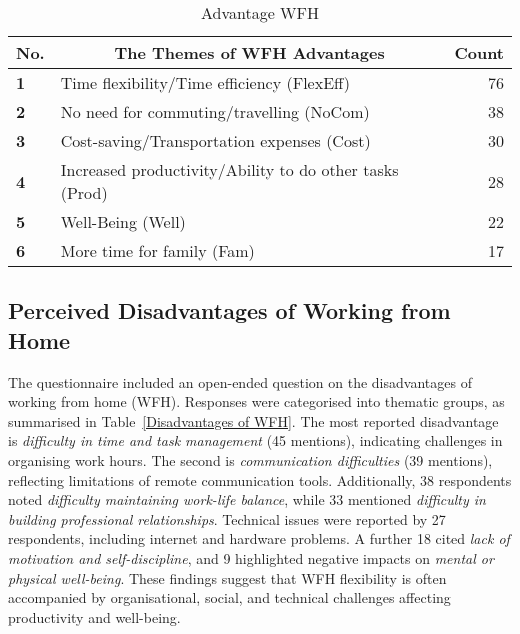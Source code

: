 \documentclass[a4paper, conference]{IEEEtran}
\begin{document}
\begin{table}[ht]
	\caption{Advantage WFH}
	\label{Advantage of WFH}
	\begin{tabular}{|p{}|p{}|r|}
		\hline
		\multicolumn{1}{|c|}{\textbf{No.}} & \multicolumn{1}{c|}{\textbf{The Themes of WFH Advantages}} & \textbf{Count} \\ \hline
		\textbf{1}                 & Time flexibility/Time efficiency (FlexEff)         &76 %
		\\ \hline
		\textbf{2}                 & No need for commuting/travelling (NoCom)        & 38 %
		\\ \hline
		\textbf{3}                 & Cost-saving/Transportation expenses (Cost)        & 30 %
		\\ \hline
		\textbf{4}                 & Increased productivity/Ability to do other tasks (Prod)& 28 %
		\\ \hline
		\textbf{5}                 & Well-Being (Well)        & 22     
		\\ \hline
		\textbf{6}                 & More time for family (Fam)              & 17 %
		\\ \hline
	\end{tabular}
\end{table}

\subsection{Perceived Disadvantages of Working from Home}
\label{sec:disadvantage-wfh}

The questionnaire included an open-ended question on the disadvantages of working from home (WFH). Responses were categorised into thematic groups, as summarised in Table~\ref{Disadvantages of WFH}. The most reported disadvantage is \textit{difficulty in time and task management} (45 mentions), indicating challenges in organising work hours. The second is \textit{communication difficulties} (39 mentions), reflecting limitations of remote communication tools. Additionally, 38 respondents noted \textit{difficulty maintaining work-life balance}, while 33 mentioned \textit{difficulty in building professional relationships}. Technical issues were reported by 27 respondents, including internet and hardware problems. A further 18 cited \textit{lack of motivation and self-discipline}, and 9 highlighted negative impacts on \textit{mental or physical well-being}. These findings suggest that WFH flexibility is often accompanied by organisational, social, and technical challenges affecting productivity and well-being.
\end{document}
